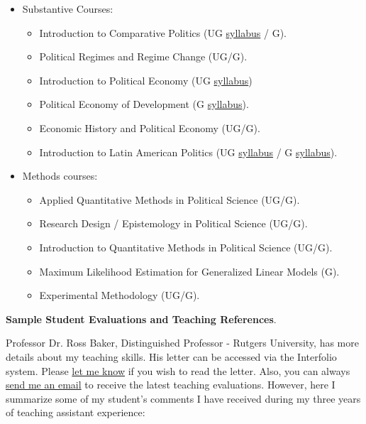 \documentclass[10pt,stdletter,dateno,sigleft]{newlfm} %
\begin{document}
\begin{newlfm}
\begin{itemize}
\item Substantive Courses:
	\begin{itemize}
	\item Introduction to Comparative Politics (UG \href{https://github.com/hbahamonde/Comparative_Politics_UGRAD/raw/master/Bahamonde_Comparative_Politics_Syllabus_UGRAD.pdf}{syllabus} / G).
	\item Political Regimes and Regime Change (UG/G).
	\item Introduction to Political Economy (UG \href{https://github.com/hbahamonde/Political-Economy-Intro-UGrad/raw/master/Pol_Econ_Dev_Syllabus_UGRAD.pdf}{syllabus})
	\item Political Economy of Development (G \href{https://github.com/hbahamonde/Pol_Econ_Dev_Grad/raw/master/Pol_Econ_Dev_Syllabus_GRAD.pdf}{syllabus}).
	\item Economic History and Political Economy (UG/G).
	\item Introduction to Latin American Politics (UG \href{https://github.com/hbahamonde/Latin_American_Politics_UGRAD/raw/master/Bahamonde_Latin_American_Politics_Syllabus_UGRAD.pdf}{syllabus} / G \href{https://github.com/hbahamonde/Latin_American_Politics_GRAD/raw/master/Bahamonde_Latin_American_Politics_Syllabus_GRAD.pdf}{syllabus}).
	\end{itemize}
\item Methods courses:
	\begin{itemize}
	\item Applied Quantitative Methods in Political Science (UG/G).
	\item Research Design / Epistemology in Political Science (UG/G).
	\item Introduction to Quantitative Methods in Political Science (UG/G).
	\item Maximum Likelihood Estimation for Generalized Linear Models (G).
	\item Experimental Methodology (UG/G).
	\end{itemize}
\end{itemize}

\newpage
{\bf Sample Student Evaluations and Teaching References}. 

Professor Dr. Ross Baker, Distinguished Professor - Rutgers University, has more details about my teaching skills. His letter can be accessed via the Interfolio system. Please \href{mailto:bahamondeh@gmail.com}{let me know} if you wish to read the letter. Also, you can always \href{mailto:bahamondeh@gmail.com}{send me an email} to receive the latest teaching evaluations. However, here I summarize some of my student's comments I have received during my three years of teaching assistant experience:



\end{newlfm}
\end{document}

